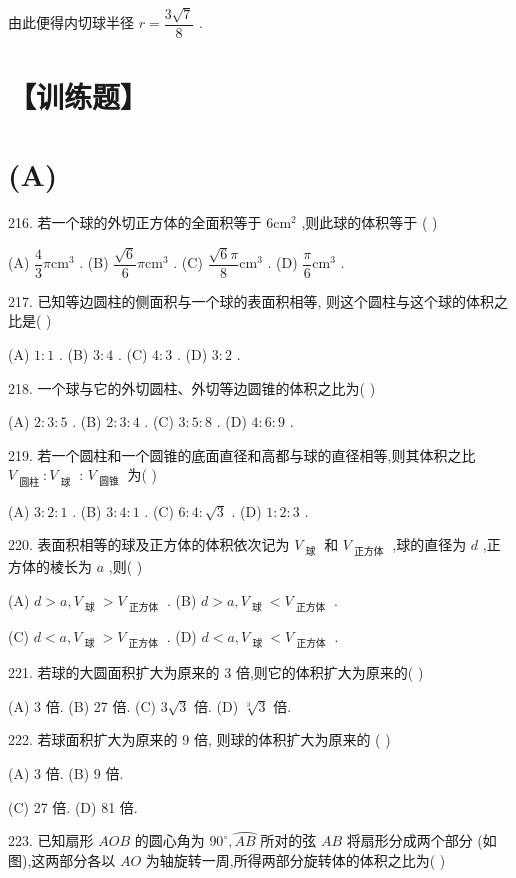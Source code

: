 由此便得内切球半径 $r = \dfrac{3\sqrt{7}}{8}$ .

\section*{【训练题】}

\section*{(A)}

216. 若一个球的外切正方体的全面积等于 $6{\mathrm{{cm}}}^{2}$ ,则此球的体积等于 (   )

(A) $\dfrac{4}{3}\pi {\mathrm{{cm}}}^{3}$ . (B) $\dfrac{\sqrt{6}}{6}\pi {\mathrm{{cm}}}^{3}$ . (C) $\dfrac{\sqrt{6}\pi }{8}{\mathrm{{cm}}}^{3}$ . (D) $\dfrac{\pi }{6}{\mathrm{{cm}}}^{3}$ .

217. 已知等边圆柱的侧面积与一个球的表面积相等, 则这个圆柱与这个球的体积之比是(   )

(A) $1 : 1$ . (B) $3 : 4$ . (C) $4 : 3$ . (D) $3 : 2$ .

218. 一个球与它的外切圆柱、外切等边圆锥的体积之比为(   )

(A) $2 : 3 : 5$ . (B) $2 : 3 : 4$ . (C) $3 : 5 : 8$ . (D) $4 : 6 : 9$ .

219. 若一个圆柱和一个圆锥的底面直径和高都与球的直径相等,则其体积之比 ${V}_{\text{ 圆柱 }} : {V}_{\text{ 球 }}$ : ${V}_{\text{ 圆锥 }}$ 为(   )

(A) $3 : 2 : 1$ . (B) $3 : 4 : 1$ . (C) $6 : 4 : \sqrt{3}$ . (D) $1 : 2 : 3$ .

220. 表面积相等的球及正方体的体积依次记为 ${V}_{\text{ 球 }}$ 和 ${V}_{\text{ 正方体 }}$ ,球的直径为 $d$ ,正方体的棱长为 $a$ ,则(   )

(A) $d > a,{V}_{\text{ 球 }} > {V}_{\text{ 正方体 }}$ . (B) $d > a,{V}_{\text{ 球 }} < {V}_{\text{ 正方体 }}$ .

(C) $d < a,{V}_{\text{ 球 }} > {V}_{\text{ 正方体 }}$ . (D) $d < a,{V}_{\text{ 球 }} < {V}_{\text{ 正方体 }}$ .

221. 若球的大圆面积扩大为原来的 3 倍,则它的体积扩大为原来的(   )

(A) 3 倍. (B) 27 倍. (C) $3\sqrt{3}$ 倍. (D) $\sqrt[3]{3}$ 倍.

222. 若球面积扩大为原来的 9 倍, 则球的体积扩大为原来的 (   )

(A) 3 倍. (B) 9 倍.

(C) 27 倍. (D) 81 倍.

223. 已知扇形 ${AOB}$ 的圆心角为 ${90}^{ \circ  },\overset{⏜}{AB}$ 所对的弦 ${AB}$ 将扇形分成两个部分 (如图),这两部分各以 ${AO}$ 为轴旋转一周,所得两部分旋转体的体积之比为(   )

